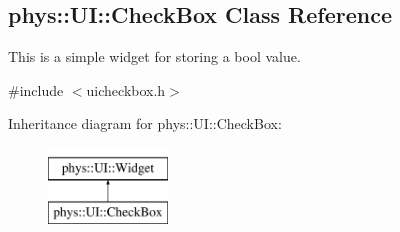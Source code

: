 \hypertarget{classphys_1_1UI_1_1CheckBox}{
\subsection{phys::UI::CheckBox Class Reference}
\label{classphys_1_1UI_1_1CheckBox}
}


This is a simple widget for storing a bool value.  




{\ttfamily \#include $<$uicheckbox.h$>$}

Inheritance diagram for phys::UI::CheckBox:\begin{figure}[H]
\begin{center}
\leavevmode
\includegraphics[height=2.000000cm]{classphys_1_1UI_1_1CheckBox}
\end{center}
\end{figure}
